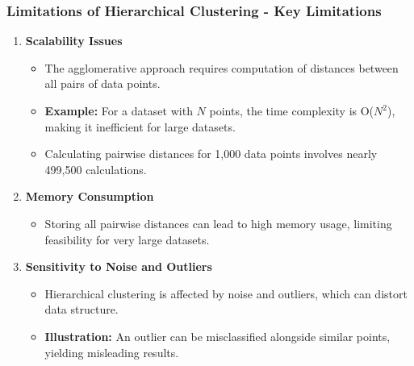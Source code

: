 \documentclass[aspectratio=169]{beamer}
\begin{document}
\begin{frame}[fragile]
    \frametitle{Limitations of Hierarchical Clustering - Key Limitations}
    \begin{enumerate}
        \item \textbf{Scalability Issues}
            \begin{itemize}
                \item The agglomerative approach requires computation of distances between all pairs of data points.
                \item \textbf{Example:} For a dataset with \(N\) points, the time complexity is O(\(N^2\)), making it inefficient for large datasets.
                \item Calculating pairwise distances for 1,000 data points involves nearly 499,500 calculations.
            \end{itemize}
        
        \item \textbf{Memory Consumption}
            \begin{itemize}
                \item Storing all pairwise distances can lead to high memory usage, limiting feasibility for very large datasets.
            \end{itemize}
        
        \item \textbf{Sensitivity to Noise and Outliers}
            \begin{itemize}
                \item Hierarchical clustering is affected by noise and outliers, which can distort data structure.
                \item \textbf{Illustration:} An outlier can be misclassified alongside similar points, yielding misleading results.
            \end{itemize}
    \end{enumerate}
\end{frame}
\end{document}
